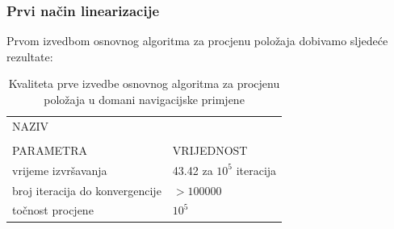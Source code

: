 \documentclass[a4paper,twoside,12pt]{memoir} %
\begin{document}
\subsubsection{Prvi način linearizacije}
Prvom izvedbom osnovnog algoritma za procjenu položaja dobivamo sljedeće rezultate:
\begin{table}[H]
	\caption{Kvaliteta prve izvedbe osnovnog algoritma za procjenu položaja u domani navigacijske primjene}
	\begin{center}
		\begin{tabular}{|p{3cm}|p{4cm}}
			\hline
			\rowcolor{lightgray}NAZIV&   \\
			\rowcolor{lightgray}&   \\
			\multirow{-3}{1cm}{ \cellcolor{lightgray}PARAMETRA} & \multirow{-3}{2cm}{\cellcolor{lightgray}VRIJEDNOST} \\
			\hline
			\vspace{0.1cm}
			vrijeme izvršavanja & \vspace{0.1cm}  43.42 za $10^5$ iteracija\\
			\vspace{0.1cm}
			broj iteracija do konvergencije & \vspace{0.1cm} $> 100000$ \\
			\vspace{0.1cm}
			točnost procjene & \vspace{0.1cm} $10^5$ \\
			\hline
		\end{tabular}
	\end{center}
\end{table}
\end{document}
